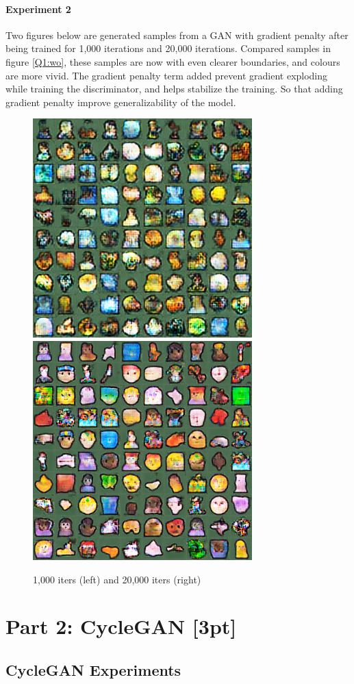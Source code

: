 \documentclass{article}
\begin{document}
	\paragraph{Experiment 2} Two figures below are generated samples from a GAN with gradient penalty after being trained for 1,000 iterations and 20,000 iterations. Compared samples in figure \ref{Q1:wo}, these samples are now with even clearer boundaries, and colours are more vivid. The gradient penalty term added prevent gradient exploding while training the discriminator, and helps stabilize the training. So that adding gradient penalty improve generalizability of the model.  
	\begin{figure}[H]
		\centering
		\caption{1,000 iters (left) and 20,000 iters (right)}
		\includegraphics[width=0.45\linewidth]{./samples_dcgan_gp_alpha_alpha/sample-001000.png}
		\includegraphics[width=0.45\linewidth]{./samples_dcgan_gp_alpha_alpha/sample-020000.png}
	\end{figure}
	
	\section{Part 2: CycleGAN [3pt]}
	\subsection{CycleGAN Experiments}
\end{document}
